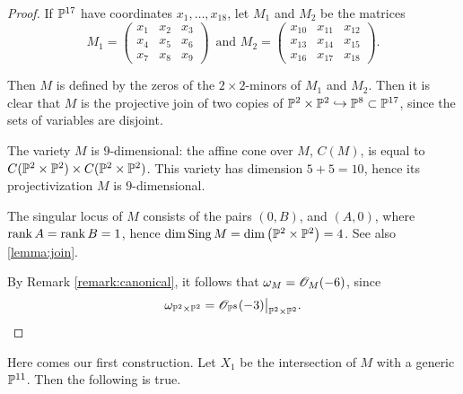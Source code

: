 \begin{proof}
If $\P^{17}$ have coordinates $x_1,\ldots,x_{18}$, let $M_1$ and $M_2$ be the matrices
\[
M_1 = \begin{pmatrix}
x_1 & x_2 & x_3 \\
x_4 & x_5 & x_6 \\
x_7 & x_8 & x_9 
\end{pmatrix}\,
\text{ and }
M_2 = \begin{pmatrix}
x_{10} & x_{11} & x_{12} \\
x_{13} & x_{14} & x_{15} \\
x_{16} & x_{17} & x_{18}
\end{pmatrix}.
\]

Then $M$ is defined by the zeros of the $2 \times 2$-minors of $M_1$ and $M_2$. Then it is clear that $M$ is the projective join of two copies of $\mathbb P^2 \times \mathbb P^2 \hookrightarrow \mathbb P^8 \subset \P^{17}$, since the sets of variables are disjoint.

The variety $M$ is $9$-dimensional: the affine cone over $M$, $C(M)$, is equal to $C(\mathbb P^2 \times \P^2) \times C(\mathbb P^2 \times \P^2)$. This variety has dimension $5+5=10$, hence its projectivization $M$ is $9$-dimensional. 

The singular locus of $M$ consists of the pairs $(0,B)$, and $(A,0)$, where $\rank A= \rank B = 1$, hence $\dim \Sing M = \dim \left( \P^2 \times \P^2 \right) = 4$. See also \cref{lemma:join}.

By Remark \ref{remark:canonical}, it follows that $\omega_M = \OO_M(-6)$, since 
\[
\omega_{\P^2 \times \P^2} = \restr{\OO_{\P^8}(-3)}{\P^2 \times \P^2}.
\]
\end{proof}

Here comes our first construction. Let $X_1$ be the intersection of $M$ with a generic $\P^{11}$. Then the following is true.


